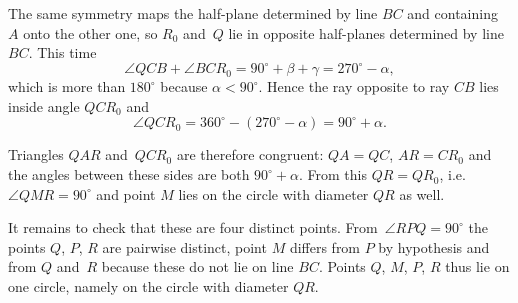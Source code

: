 {    The same symmetry maps the half-plane determined by line $BC$ and containing $A$ onto the other one, so $R_0$ and~$Q$ lie in opposite half-planes determined by line $BC$. This time
    $$
    \angle QCB + \angle BCR_0 = 90^\circ + \beta + \gamma = 270^\circ - \alpha,
    $$
    which is more than $180^\circ$ because $\alpha < 90^\circ$. Hence the ray opposite to ray $CB$ lies inside angle $QCR_0$ and~
    $$
    \angle QCR_0 = 360^\circ - (270^\circ - \alpha) = 90^\circ + \alpha.
    $$

    Triangles $QAR$ and~$QCR_0$ are therefore congruent: $QA = QC$, $AR = CR_0$ and the angles between these sides are both $90^\circ + \alpha$. From this $QR = QR_0$, i.e. $\angle QMR = 90^\circ$ and point $M$ lies on the circle with diameter $QR$ as well.

    It remains to check that these are four distinct points. From~$\angle RPQ = 90^\circ$ the points $Q$, $P$, $R$ are pairwise distinct, point $M$ differs from $P$ by hypothesis and from $Q$ and~$R$ because these do not lie on line $BC$. Points $Q$, $M$, $P$, $R$ thus lie on one circle, namely on the circle with diameter $QR$.
}

